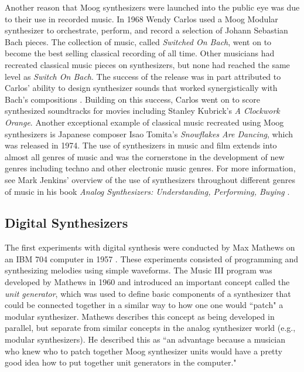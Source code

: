 Another reason that Moog synthesizers were launched into the public eye was due to  their use in recorded music. In 1968 Wendy Carlos used a Moog Modular synthesizer to orchestrate, perform, and record a selection of Johann Sebastian Bach pieces. The collection of music, called \textit{Switched On Bach}, went on to become the best selling classical recording of all time. Other musicians had recreated classical music pieces on synthesizers, but none had reached the same level as \textit{Switch On Bach}. The success of the release was in part attributed to Carlos' ability to design synthesizer sounds that worked synergistically with Bach's compositions \cite{jenkins2019analog}. Building on this success, Carlos went on to score synthesized soundtracks for movies including Stanley Kubrick's \textit{A Clockwork Orange}. Another exceptional example of classical music recreated using Moog synthesizers is Japanese composer Isao Tomita's \textit{Snowflakes Are Dancing}, which was released in 1974. The use of synthesizers in music and film extends into almost all genres of music and was the cornerstone in the development of new genres including techno and other electronic music genres. For more information, see Mark Jenkins' overview of the use of synthesizers throughout different genres of music in his book \textit{Analog Synthesizers: Understanding, Performing, Buying} \cite{jenkins2019analog}.

\subsection{Digital Synthesizers}
The first experiments with digital synthesis were conducted by Max Mathews on an IBM 704 computer in 1957 \cite{roads1980interview}. These experiments consisted of programming and synthesizing melodies using simple waveforms. The Music III program was developed by Mathews in 1960 and introduced an important concept called the \textit{unit generator}, which was used to define basic components of a synthesizer that could be connected together in a similar way to how one one would ``patch" a modular synthesizer. Mathews describes this concept as being developed in parallel, but separate from similar concepts in the analog synthesizer world (e.g., modular synthesizers). He described this as ``an advantage because a musician who knew who to patch together Moog synthesizer units would have a pretty good idea how to put together unit generators in the computer."

